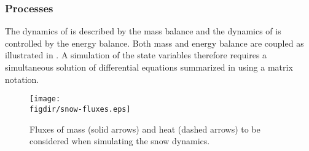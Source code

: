 \subsubsection{Processes}
The dynamics of \snowWaterEquivalent{} is described by the mass balance and the dynamics of \snowEnergyContent{} is controlled by the energy balance. Both mass and energy balance are coupled as illustrated in . A simulation of the state variables therefore requires a simultaneous solution of  differential equations summarized in  using a matrix notation.

\begin{figure}[htb]
  \centering
  \texttt{[image: \\figdir/snow-fluxes.eps]}
  \caption[Fluxes of mass and heat to be considered when simulating the snow dynamics.]{Fluxes of mass (solid arrows) and heat (dashed arrows) to be considered when simulating the snow dynamics. \label{fig:snow-enBal_snow-fluxes}}
\end{figure}

